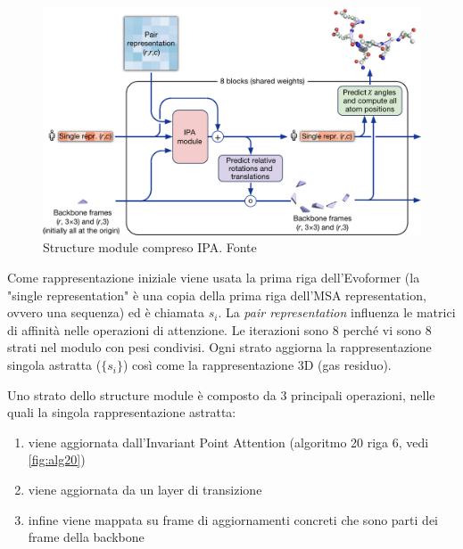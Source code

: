 \begin{figure}[!htb]
	\centering
	\includegraphics[scale=0.4]{images/structure-module-ipa.png}
	\caption{Structure module compreso IPA. Fonte\cite{jumper2021highly}}
	\label{fig:struct-ipa}
\end{figure}

\par Come rappresentazione iniziale viene usata la prima riga dell'Evoformer (la "single representation" è una copia della prima riga dell'MSA representation, ovvero una sequenza) ed è chiamata $s_{i}$. La \textit{pair representation} influenza le matrici di affinità nelle operazioni di attenzione. Le iterazioni sono 8 perché vi sono 8 strati nel modulo con pesi condivisi. Ogni strato aggiorna la rappresentazione singola astratta ($\{s_{i}\}$) così come la rappresentazione 3D (gas residuo).

\par Uno strato dello structure module è composto da 3 principali operazioni, nelle quali la singola rappresentazione astratta: 

\begin{enumerate}
	\item viene aggiornata dall'Invariant Point Attention (algoritmo 20 riga 6, vedi \ref{fig:alg20}) 
	\item viene aggiornata da un layer di transizione
	\item infine viene mappata su frame di aggiornamenti concreti che sono parti dei frame della backbone
\end{enumerate}

